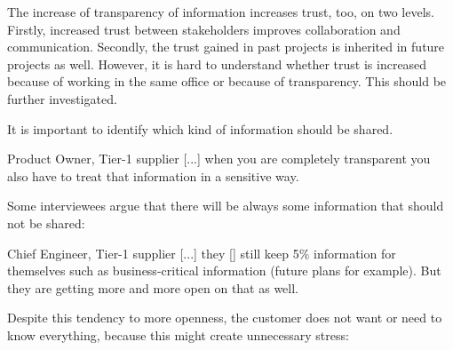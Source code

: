  The increase of transparency of information increases trust, too, on two levels. Firstly, increased trust between stakeholders improves collaboration and communication. Secondly, the trust gained in past projects %
is inherited %
in future projects as well. However, it is hard to understand whether trust is increased because of working in the same office or because of transparency. This should be %
{further} investigated. %

It is important to identify which kind of information should be shared. 
\begin{aquote}{Product Owner, Tier-1 supplier}
 [...] when you are completely transparent you also have to treat that information in a sensitive way.
\end{aquote}

Some interviewees argue that there will be always some information that should not be shared:

\begin{aquote}{Chief Engineer, Tier-1 supplier}
[...] they [\company{}] still keep 5\% information for themselves such as business-critical information (future plans for example). But they are getting more and more open on that as well.
\end{aquote}


Despite this tendency to more openness, the customer does not want or need to know everything, because this might create unnecessary stress: %

